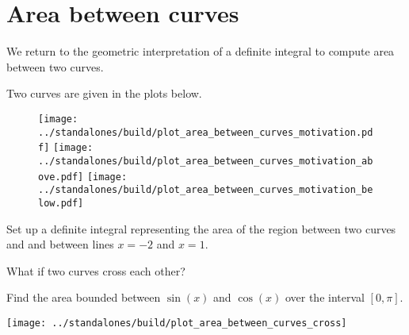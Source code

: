 \documentclass[../main.tex]{subfiles}
\begin{document}
 \section{Area between curves}
  We return to the geometric interpretation of a definite integral to compute area between two curves.

  \begin{example}
    Two curves are given in the plots below. 
    \begin{figure}[H]
      \centering
      \texttt{[image: ../standalones/build/plot\_area\_between\_curves\_motivation.pdf]}
      \hspace{1em}
      \texttt{[image: ../standalones/build/plot\_area\_between\_curves\_motivation\_above.pdf]}
      \hspace{2em}
      \texttt{[image: ../standalones/build/plot\_area\_between\_curves\_motivation\_below.pdf]}
    \end{figure}

    Set up a definite integral representing the area of the region between two curves  and  and between lines \(x = -2\) and \(x = 1\).


  \end{example}

  What if two curves cross each other?
  \begin{example}
    Find the area bounded between \(\sin(x)\) and \(\cos(x)\) over the interval \([0, \pi]\).

    \texttt{[image: ../standalones/build/plot\_area\_between\_curves\_cross]}

  \end{example}
\end{document}
